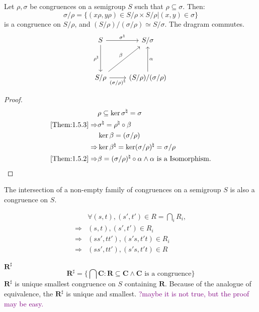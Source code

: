 \begin{Them}\label{Them:1.5.4}
    Let $\rho, \sigma$ be congruences on a semigroup $S$ such that $\rho \subseteq \sigma$. Then:
    \[
        \sigma/\rho = 
        \{
            (x\rho, y\rho)\in S/\rho \times S/\rho | (x,y)\in \sigma
        \}
    \]
    is a congruence on $S/\rho$, and $(S/\rho)/(\sigma/\rho) \simeq S/\sigma$. The dragram commutes.
    \[\begin{tikzcd}
        S
        \arrow[r, "\sigma^{\natural}"]
        \arrow[dd, "\rho^{\natural}"'] &
        S/\sigma    \\
        \\
        S/\rho
        \arrow[uur, "\beta"]
        \arrow[r, "(\sigma/\rho)^{\natural}"'] &
        (S/\rho)/(\sigma/\rho)
        \arrow[uu, "\alpha"']
    \end{tikzcd}\]
    \begin{proof}
        \begin{align*}
            & \rho \subseteq \ker \sigma^{\natural} = \sigma \\
            \ref{Them:1.5.3}\Rightarrow& \sigma^{\natural} = \rho^{\natural}\circ \beta \\
            & \ker \beta = (\sigma/\rho)    \\
            \Rightarrow& \ker \beta^{\natural} = \ker(\sigma/\rho)^{\natural} = \sigma/\rho \\
            \ref{Them:1.5.2}\Rightarrow& \beta = (\sigma/\rho)^{\natural}\circ \alpha \wedge \alpha \text{ is a Isomorphism.}
        \end{align*}
    \end{proof}
\end{Them}

The intersection of a non-empty family of congruences on a semigroup $S$ is also a congruence on $S$.

\begin{align*}
    & \forall (s,t),(s',t')\in R = \bigcap_i R_i,  \\
    \Rightarrow & (s, t),(s',t') \in R_i    \\
    \Rightarrow & (ss', tt'),(s's, t't) \in R_i \\
    \Rightarrow & (ss', tt'),(s's, t't) \in R
\end{align*}

\begin{Def}$\mathbf{R}^{\sharp}$
    \[
        \mathbf{R}^{\sharp} = \{\bigcap \mathbf{C} : \mathbf{R} \subseteq \mathbf{C} \wedge \mathbf{C}\text{ is a congruence}\}
    \]
    $\mathbf{R}^{\sharp}$ is unique smallest congruence on $S$ containing $\mathbf{R}$.
    Because of the analogue of equivalence, the $\mathbf{R}^{\sharp}$ is unique and smallest. \textcolor{purple}{?maybe it is not true, but the proof may be easy.}
\end{Def}

